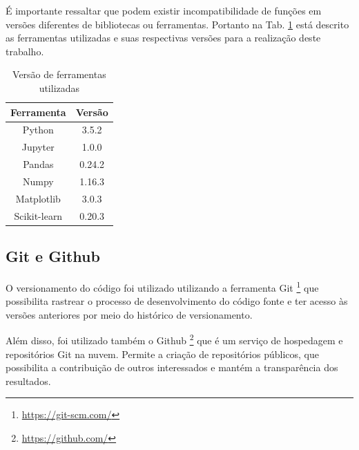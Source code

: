 É importante ressaltar que podem existir incompatibilidade de funções em versões diferentes de bibliotecas ou ferramentas. Portanto na Tab. \ref{tab:ferramentas} está descrito as ferramentas utilizadas e suas respectivas versões para a realização deste trabalho. 

\begin{table}[!h]
\centering
\label{tab:ferramentas} 
\begin{tabular}{|c|c|}
\hline
\rowcolor[HTML]{EFEFEF} 
{\color[HTML]{333333} Ferramenta} & {\color[HTML]{333333} Versão}  \\ \hline
Python                  & 3.5.2            \\ \hline
Jupyter                  & 1.0.0 \\ \hline
Pandas                  & 0.24.2 \\ \hline
Numpy                  & 1.16.3 \\ \hline
Matplotlib                  & 3.0.3 \\ \hline
Scikit-learn                  & 0.20.3 \\ \hline
\end{tabular}
\caption{Versão de ferramentas utilizadas}
\end{table}


\subsection{Git e Github}

O versionamento do código foi utilizado utilizando a ferramenta Git \footnote{\href{https://git-scm.com/}{https://git-scm.com/}} que possibilita rastrear o processo de desenvolvimento do código fonte e ter acesso às versões anteriores por meio do histórico de versionamento.

Além disso, foi utilizado também o Github \footnote{\href{https://github.com/}{https://github.com/}} que  é um serviço de hospedagem e repositórios Git na nuvem. Permite a criação de repositórios públicos, que possibilita a contribuição de outros interessados e mantém a transparência dos resultados.


